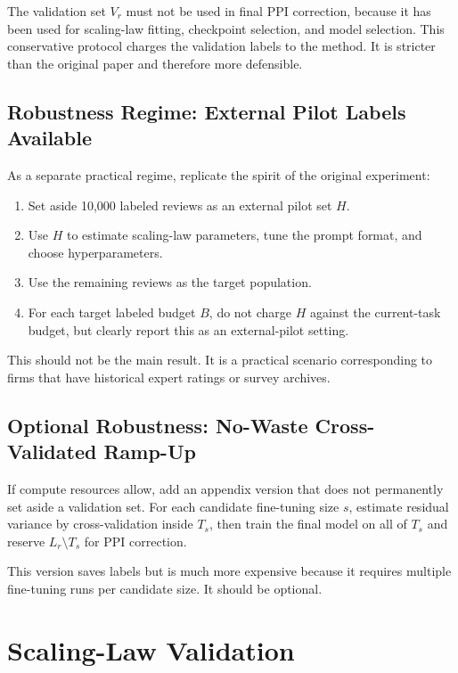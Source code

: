 \documentclass[11pt]{article}
\begin{document}
The validation set $V_r$ must not be used in final PPI correction, because it has been used for scaling-law fitting, checkpoint selection, and model selection. This conservative protocol charges the validation labels to the method. It is stricter than the original paper and therefore more defensible.

\subsection{Robustness Regime: External Pilot Labels Available}

As a separate practical regime, replicate the spirit of the original experiment:

\begin{enumerate}
    \item Set aside 10,000 labeled reviews as an external pilot set $H$.
    \item Use $H$ to estimate scaling-law parameters, tune the prompt format, and choose hyperparameters.
    \item Use the remaining reviews as the target population.
    \item For each target labeled budget $B$, do not charge $H$ against the current-task budget, but clearly report this as an external-pilot setting.
\end{enumerate}

This should not be the main result. It is a practical scenario corresponding to firms that have historical expert ratings or survey archives.

\subsection{Optional Robustness: No-Waste Cross-Validated Ramp-Up}

If compute resources allow, add an appendix version that does not permanently set aside a validation set. For each candidate fine-tuning size $s$, estimate residual variance by cross-validation inside $T_s$, then train the final model on all of $T_s$ and reserve $L_r\setminus T_s$ for PPI correction.

This version saves labels but is much more expensive because it requires multiple fine-tuning runs per candidate size. It should be optional.

\section{Scaling-Law Validation}
\end{document}
